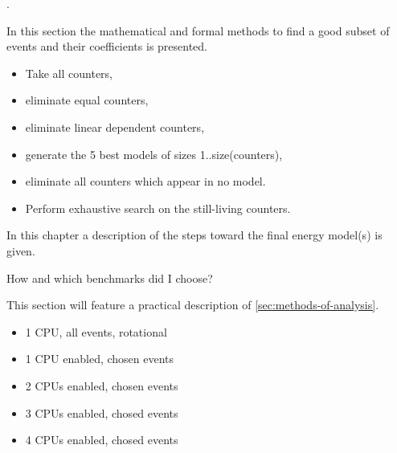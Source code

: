.

\JWlfour{\JWTdd}


\JWlfour{\JWTbsle}



\label{sec:methods-of-analysis}

In this section the mathematical and formal methods to find a good subset of
events and their coefficients is presented.

\begin{itemize}

\item Take all counters,

\item eliminate equal counters,

\item eliminate linear dependent counters,

\item generate the 5 best models of sizes 1..size(counters),

\item eliminate all counters which appear in no model.

\item Perform exhaustive search on the still-living counters.

\end{itemize}


\label{sec:towards-the-model}

In this chapter a description of the steps toward the final energy model(s) is
given.


\label{sec:benchmarks}

How and which benchmarks did I choose?



This section will feature a practical description of
\ref{sec:methods-of-analysis}.

\begin{itemize}

\item 1 CPU, all events, rotational

\item 1 CPU enabled, chosen events

\item 2 CPUs enabled, chosen events

\item 3 CPUs enabled, chosed events

\item 4 CPUs enabled, chosed events

\end{itemize}




